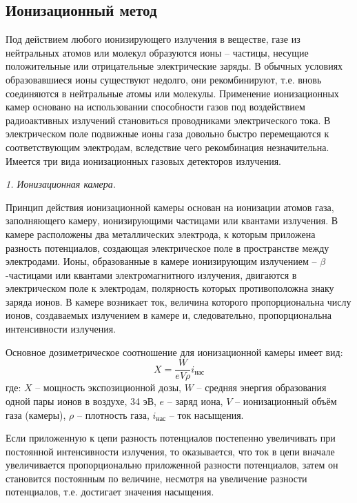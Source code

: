 \documentclass[14pt,pscyr,titlepage]{hedreport}
\begin{document}
	\subsection{Ионизационный метод} 
		Под действием любого ионизирующего излучения в веществе, газе из 
		нейтральных атомов или молекул образуются ионы -- частицы, несущие 
		положительные или отрицательные электрические заряды. В обычных 
		условиях образовавшиеся ионы существуют недолго, они рекомбинируют, 
		т.е. вновь соединяются в нейтральные атомы или молекулы. Применение 
		ионизационных камер основано на использовании способности газов под 
		воздействием радиоактивных излучений становиться проводниками 
		электрического тока. В электрическом поле подвижные ионы газа довольно 
		быстро перемещаются к соответствующим электродам, вследствие чего 
		рекомбинация незначительна. Имеется три вида ионизационных газовых 
		детекторов излучения.

		\emph{1. Ионизационная камера. }

		Принцип действия ионизационной камеры основан на ионизации атомов 
		газа, заполняющего камеру, ионизирующими частицами или квантами 
		излучения. В камере расположены два металлических электрода, к 
		которым приложена разность потенциалов, создающая электрическое поле 
		в пространстве между электродами. Ионы, образованные в камере 
		ионизирующим излучением -- \( \beta \)-частицами или квантами 
		электромагнитного излучения, двигаются в электрическом поле к 
		электродам, полярность которых противоположна знаку заряда ионов. 
		В камере возникает ток, величина которого пропорциональна числу ионов, 
		создаваемых излучением в камере и, следовательно, пропорциональна 
		интенсивности излучения.

		Основное дозиметрическое соотношение для ионизационной камеры имеет 
		вид:
		\[
			X = \frac{W}{eV\rho}i_\text{нас}
		\]
		где: \( X \) -- мощность экспозиционной дозы, \( W \) -- средняя 
		энергия образования одной пары ионов в воздухе, 34 эВ, \( e \) -- 
		заряд иона, \( V \) -- ионизационный объём газа (камеры), 
		\( \rho \) -- плотность газа, \( i_\text{нас} \) -- ток насыщения.

		Если приложенную к цепи разность потенциалов постепенно увеличивать 
		при постоянной интенсивности излучения, то оказывается, что ток в 
		цепи вначале увеличивается пропорционально приложенной разности 
		потенциалов, затем он становится постоянным по величине, несмотря на 
		увеличение разности потенциалов, т.е. достигает значения насыщения.
\end{document}
